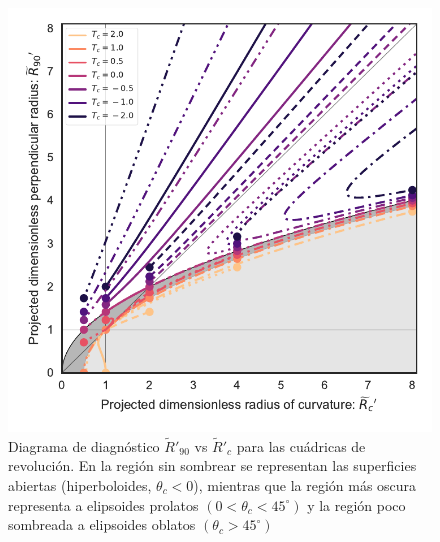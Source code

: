 \begin{figure}
  \includegraphics[width=0.5\linewidth]{./Figures/projected-R90-vs-Rc}
  \caption{Diagrama de diagnóstico $\tilde{R}'_{90}$ vs $\tilde{R}'_c$ para las cuádricas de revolución. En la región sin sombrear se representan las superficies abiertas (hiperboloides, $\theta_c <0$), mientras que la región más oscura representa a elipsoides prolatos  $(0 < \theta_c < 45^\circ)$ y la región poco sombreada a elipsoides oblatos $(\theta_c > 45^\circ)$}
  \label{fig:diagnostic}
\end{figure}

